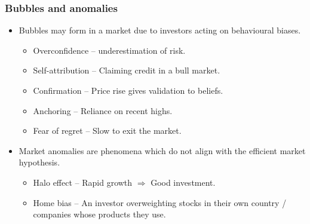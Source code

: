 \documentclass[../notes_compiled.tex]{subfiles}
\begin{document}
\subsubsection{Bubbles and anomalies}
\begin{itemize}
\item Bubbles may form in a market due to investors acting on behavioural biases.
\begin{itemize}
\item Overconfidence -- underestimation of risk.
\item Self-attribution -- Claiming credit in a bull market.
\item Confirmation -- Price rise gives validation to beliefs.
\item Anchoring -- Reliance on recent highs.
\item Fear of regret -- Slow to exit the market.
\end{itemize}
\item Market anomalies are phenomena which do not align with the efficient market hypothesis.
\begin{itemize}
\item Halo effect -- Rapid growth $\Rightarrow$ Good investment.
\item Home bias -- An investor overweighting stocks in their own country / companies whose products they use.
\end{itemize}
\end{itemize}
\end{document}
